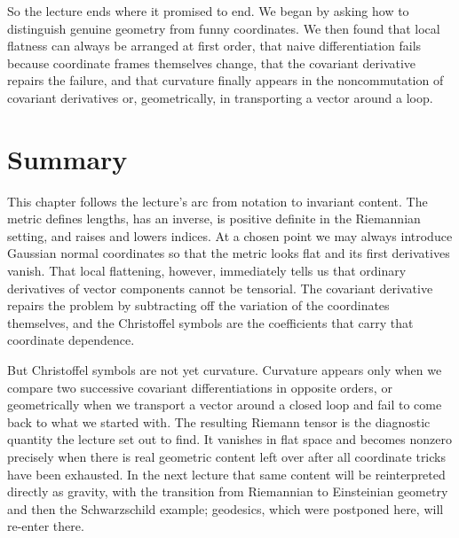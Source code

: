 So the lecture ends where it promised to end. We began by asking how to distinguish genuine geometry from funny coordinates. We then found that local flatness can always be arranged at first order, that naive differentiation fails because coordinate frames themselves change, that the covariant derivative repairs the failure, and that curvature finally appears in the noncommutation of covariant derivatives or, geometrically, in transporting a vector around a loop.

\section{Summary}

This chapter follows the lecture's arc from notation to invariant content. The metric defines lengths, has an inverse, is positive definite in the Riemannian setting, and raises and lowers indices. At a chosen point we may always introduce Gaussian normal coordinates so that the metric looks flat and its first derivatives vanish. That local flattening, however, immediately tells us that ordinary derivatives of vector components cannot be tensorial. The covariant derivative repairs the problem by subtracting off the variation of the coordinates themselves, and the Christoffel symbols are the coefficients that carry that coordinate dependence.

But Christoffel symbols are not yet curvature. Curvature appears only when we compare two successive covariant differentiations in opposite orders, or geometrically when we transport a vector around a closed loop and fail to come back to what we started with. The resulting Riemann tensor is the diagnostic quantity the lecture set out to find. It vanishes in flat space and becomes nonzero precisely when there is real geometric content left over after all coordinate tricks have been exhausted. In the next lecture that same content will be reinterpreted directly as gravity, with the transition from Riemannian to Einsteinian geometry and then the Schwarzschild example; geodesics, which were postponed here, will re-enter there.